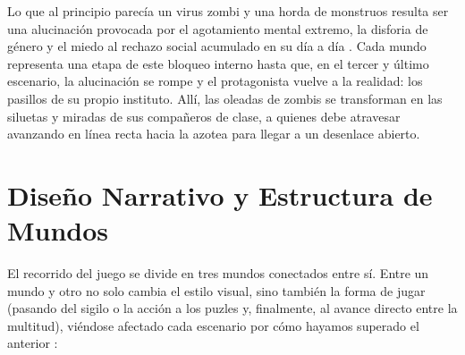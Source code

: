 Lo que al principio parecía un virus zombi y una horda de monstruos resulta ser una alucinación provocada por el agotamiento mental extremo, la disforia de género y el miedo al rechazo social acumulado en su día a día \parencite{gomez2026}. Cada mundo representa una etapa de este bloqueo interno hasta que, en el tercer y último escenario, la alucinación se rompe y el protagonista vuelve a la realidad: los pasillos de su propio instituto. Allí, las oleadas de zombis se transforman en las siluetas y miradas de sus compañeros de clase, a quienes debe atravesar avanzando en línea recta hacia la azotea para llegar a un desenlace abierto.

\section{Diseño Narrativo y Estructura de Mundos}
El recorrido del juego se divide en tres mundos conectados entre sí. Entre un mundo y otro no solo cambia el estilo visual, sino también la forma de jugar (pasando del sigilo o la acción a los puzles y, finalmente, al avance directo entre la multitud), viéndose afectado cada escenario por cómo hayamos superado el anterior \parencite{tremblay2010, renderhub2023}:

